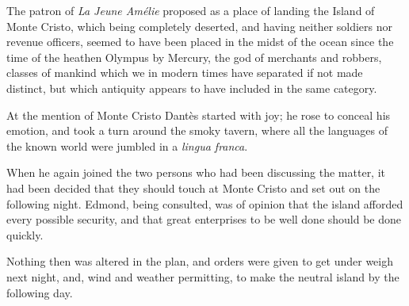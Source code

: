  The patron of \textit{La Jeune Amélie} proposed as a place of landing the Island of Monte Cristo, which being completely deserted, and having neither soldiers nor revenue officers, seemed to have been placed in the midst of the ocean since the time of the heathen Olympus by Mercury, the god of merchants and robbers, classes of mankind which we in modern times have separated if not made distinct, but which antiquity appears to have included in the same category. 

 At the mention of Monte Cristo Dantès started with joy; he rose to conceal his emotion, and took a turn around the smoky tavern, where all the languages of the known world were jumbled in a \textit{lingua franca}. 

 When he again joined the two persons who had been discussing the matter, it had been decided that they should touch at Monte Cristo and set out on the following night. Edmond, being consulted, was of opinion that the island afforded every possible security, and that great enterprises to be well done should be done quickly. 

 Nothing then was altered in the plan, and orders were given to get under weigh next night, and, wind and weather permitting, to make the neutral island by the following day.